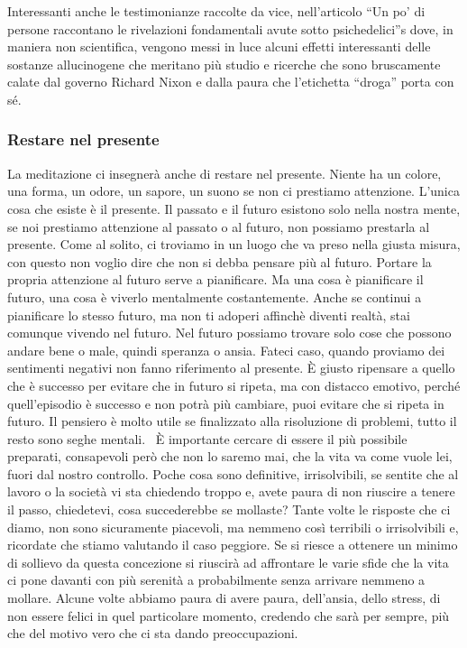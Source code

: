 \documentclass[12pt]{book} %
\begin{document}
Interessanti anche le testimonianze raccolte da vice, nell'articolo “Un po' di persone raccontano
le rivelazioni fondamentali avute sotto
psichedelici”s dove, in maniera non
scientifica, vengono messi in luce alcuni effetti interessanti delle sostanze allucinogene che meritano più studio e
ricerche che sono bruscamente calate dal governo Richard Nixon e dalla paura che l'etichetta
“droga” porta con sé. 

\subsubsection{Restare nel presente}
La meditazione ci insegnerà anche di restare nel presente. Niente ha un colore, una forma, un odore, un sapore, un suono
se non ci prestiamo attenzione. L'unica cosa che esiste è il presente. Il passato e il futuro
esistono solo nella nostra mente, se noi prestiamo attenzione al passato o al futuro, non possiamo prestarla al
presente. Come al solito, ci troviamo in un luogo che va preso nella giusta misura, con questo non voglio dire che non
si debba pensare più al futuro. Portare la propria attenzione al futuro serve a pianificare. Ma una cosa è pianificare
il futuro, una cosa è viverlo mentalmente costantemente. Anche se continui a pianificare lo stesso futuro, ma non ti
adoperi affinchè diventi realtà, stai comunque vivendo nel futuro. Nel futuro possiamo trovare solo cose che possono
andare bene o male, quindi speranza o ansia. Fateci caso, quando proviamo dei sentimenti negativi non fanno riferimento
al presente. È giusto ripensare a quello che è successo per evitare che in futuro si ripeta, ma con distacco emotivo,
perché quell'episodio è successo e non potrà più cambiare, puoi evitare che si ripeta in futuro.
Il pensiero è molto utile se finalizzato alla risoluzione di problemi, tutto il resto sono seghe mentali. \ È
importante cercare di essere il più possibile preparati, consapevoli però che non lo saremo mai, che la vita va come
vuole lei, fuori dal nostro controllo. Poche cosa sono definitive, irrisolvibili, se sentite che al lavoro o la società
vi sta chiedendo troppo e, avete paura di non riuscire a tenere il passo, chiedetevi, cosa succederebbe se mollaste?
Tante volte le risposte che ci diamo, non sono sicuramente piacevoli, ma nemmeno così terribili o irrisolvibili e,
ricordate che stiamo valutando il caso peggiore. Se si riesce a ottenere un minimo di sollievo da questa concezione si
riuscirà ad affrontare le varie sfide che la vita ci pone davanti con più serenità a probabilmente senza arrivare
nemmeno a mollare. Alcune volte abbiamo paura di avere paura, dell'ansia, dello stress, di non
essere felici in quel particolare momento, credendo che sarà per sempre, più che del motivo vero che ci sta dando
preoccupazioni.
\end{document}
